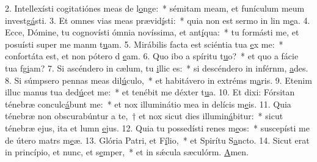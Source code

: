2. Intellexísti cogitatiónes meas de l\uline{o}nge:~* sémitam meam, et funículum meum investg\uline{á}sti.
3. Et omnes vias meas prævid\uline{í}sti:~* quia non est sermo in lin m\uline{e}a.
4. Ecce, Dómine, tu cognovísti ómnia novíssima, et ant\uline{í}qua:~* tu formásti me, et posuísti super me manm t\uline{u}am.
5. Mirábilis facta est sciéntia tua \uline{e}x me:~* confortáta est, et non pótero d \uline{e}am.
6. Quo ibo a spíritu t\uline{u}o?~* et quo a fácie tua fg\uline{i}am?
7. Si ascéndero in cælum, tu \uline{i}llic es:~* si descéndero in inférnm, \uline{a}des.
8. Si súmpsero pennas meas dil\uline{ú}culo,~* et habitávero in extréms m\uline{a}ris.
9. Etenim illuc manus tua ded\uline{ú}cet me:~* et tenébit me déxter t\uline{u}a.
10. Et dixi: Fórsitan ténebræ conculc\uline{á}bunt me:~* et nox illuminátio mea in delícis m\uline{e}is.
11. Quia ténebræ non obscurabúntur a te,~† et nox sicut dies illumin\uline{á}bitur:~* sicut ténebræ ejus, ita et lumn \uline{e}jus.
12. Quia tu possedísti renes m\uline{e}os:~* suscepísti me de útero matrs m\uline{e}æ.
13. Glória Patri, et F\uline{í}lio,~* et Spirítu S\uline{a}ncto.
14. Sicut erat in princípio, et nunc, et s\uline{e}mper,~* et in sǽcula sæculórm. \uline{A}men.
